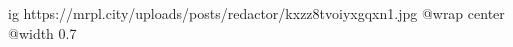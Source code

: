  
 
 
 
 

\ifcmt
  ig https://mrpl.city/uploads/posts/redactor/kxzz8tvoiyxgqxn1.jpg
  @wrap center
  @width 0.7
\fi
